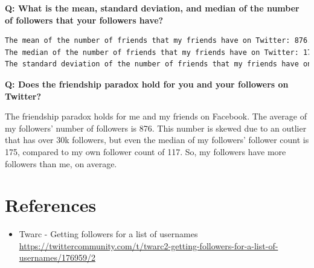 \documentclass[12pt]{article}
\begin{document}
\noindent\textbf{Q: What is the mean, standard deviation, and median of the number of followers that your followers have?}

\begin{lstlisting}[language=bash, caption=summary statistics for Twitter followers, label=lst:copy]
The mean of the number of friends that my friends have on Twitter: 876.3305084745763
The median of the number of friends that my friends have on Twitter: 175.0
The standard deviation of the number of friends that my friends have on Twitter: 5092.913779325692
\end{lstlisting}


\noindent\textbf{Q: Does the friendship paradox hold for you and your followers on Twitter?}

The friendship paradox holds for me and my friends on Facebook. The average of my followers' number of followers is 876. This number is skewed due to an outlier that has over 30k followers, but even the median of my followers' follower count is 175, compared to my own follower count of 117. So, my followers have more followers than me, on average.

\section*{References}

\begin{itemize}
    \item{Twarc - Getting followers for a list of usernames} \url{https://twittercommunity.com/t/twarc2-getting-followers-for-a-list-of-usernames/176959/2}
\end{itemize}
\end{document}
